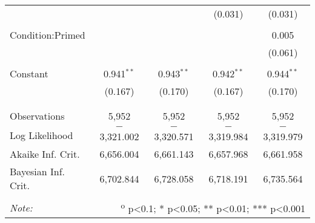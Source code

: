\begin{table}[!htbp]
\begin{tabular}{@{\extracolsep{5pt}}lcccc}
  &  &  & (0.031) & (0.031) \\
  & & & & \\
 Condition:Primed &  &  &  & 0.005 \\
  &  &  &  & (0.061) \\
  & & & & \\
 Constant & 0.941$^{**}$ & 0.943$^{**}$ & 0.942$^{**}$ & 0.944$^{**}$ \\
  & (0.167) & (0.170) & (0.167) & (0.170) \\
  & & & & \\
\hline \\[-1.8ex]
Observations & 5,952 & 5,952 & 5,952 & 5,952 \\
Log Likelihood & $-$3,321.002 & $-$3,320.571 & $-$3,319.984 & $-$3,319.979 \\
Akaike Inf. Crit. & 6,656.004 & 6,661.143 & 6,657.968 & 6,661.958 \\
Bayesian Inf. Crit. & 6,702.844 & 6,728.058 & 6,718.191 & 6,735.564 \\
\hline
\hline \\[-1.8ex]
\textit{Note:}  & \multicolumn{4}{r}{\textsuperscript{o} p<0.1; * p<0.05; ** p<0.01; *** p<0.001} \\
\end{tabular}
\end{table}
